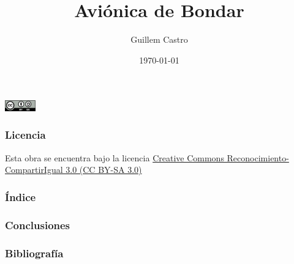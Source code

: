 \documentclass[numfooter]{beamer}
\begin{document}
    
    \title{Aviónica de Bondar}
    \author{Guillem Castro}
    \date{\today}

    \begin{frame}
        \maketitle
        \centering
        \includegraphics[width=50px]{images/ccbysa.png}
    \end{frame}

    \begin{frame}
        \frametitle{Licencia}
        Esta obra se encuentra bajo la licencia \href{https://creativecommons.org/licenses/by-sa/3.0/es/}{Creative Commons Reconocimiento-CompartirIgual 3.0 (CC BY-SA 3.0)}

    \end{frame}
    
    \begin{frame}
        \frametitle{Índice}
    
    \end{frame}
    
    
    \begin{frame}
        \frametitle{Conclusiones}
        
    \end{frame}
    
    \begin{frame}
    
        \frametitle{Bibliografía}
        
    \end{frame}
  
    
    
\end{document}
